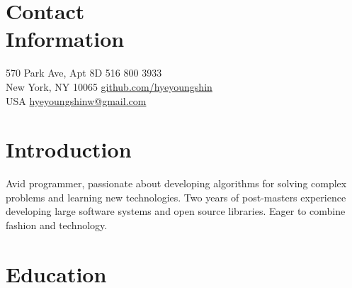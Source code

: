 \documentclass[margin,line]{resume}
\begin{document}
\newcommand{\Hawaii}{Hawai\kern.05em`\kern.05em\relax i}
\newcommand{\Manoa}{M\=anoa}

\begin{resume}

    \section{\mysidestyle Contact\\Information}
     570 Park Ave, Apt 8D            \hfill    516 800 3933\\
     New York, NY 10065             \hfill    \href{https://github.com/hyeyoungshin}{github.com/hyeyoungshin}\\
     USA  \hfill                    \hfill    \href{mailto:hyeyoungshinw@gmail.com}{hyeyoungshinw@gmail.com}

    \section{\mysidestyle Introduction}

    Avid programmer, passionate about developing algorithms for solving complex problems and learning new technologies. Two years of post-masters experience developing large software systems and open source libraries. Eager to combine fashion and technology.
    
    \section{\mysidestyle Education}

    \newcommand\mysmallskip{4pt}
    \newcommand\mymedskip{10pt}
    \newcommand\mybigskip{14pt}


\end{resume}
\end{document}
